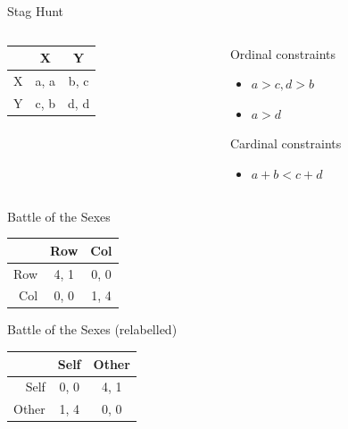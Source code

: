 \documentclass[
  14pt,
  letterpaper,
  ignorenonframetext,
  aspectratio=169,
  handout]{beamer}
\providecommand{\tightlist}{%
  \setlength{\itemsep}{0pt}\setlength{\parskip}{0pt}}\usepackage{longtable,booktabs,array}
\let\olditem\item
\renewcommand{\item}{%
\olditem\vspace{6pt}}
\begin{document}
\begin{frame}[fragile]{Stag Hunt}
\protect\hypertarget{stag-hunt-1}{}
\begin{columns}[T]
\begin{column}{0.4\textwidth}
\begin{table}[!h]
\centering
\begin{tabular}[t]{>{}r|cc}
\toprule
 & X & Y\\
\midrule
X & a, a & b, c\\
Y & c, b & d, d\\
\bottomrule
\end{tabular}
\end{table}
\end{column}

\begin{column}{0.6\textwidth}
Ordinal constraints

\begin{itemize}
\tightlist
\item
  \(a > c, d > b\)
\item
  \(a > d\)
\end{itemize}

Cardinal constraints

\begin{itemize}
\tightlist
\item
  \(a + b < c + d\)
\end{itemize}
\end{column}
\end{columns}
\end{frame}

\begin{frame}[fragile]{Battle of the Sexes}
\protect\hypertarget{battle-of-the-sexes}{}
\begin{table}[!h]
\centering
\begin{tabular}[t]{>{}r|cc}
\toprule
 & Row & Col\\
\midrule
Row & 4, 1 & 0, 0\\
Col & 0, 0 & 1, 4\\
\bottomrule
\end{tabular}
\end{table}
\end{frame}

\begin{frame}[fragile]{Battle of the Sexes (relabelled)}
\protect\hypertarget{battle-of-the-sexes-relabelled}{}
\begin{table}[!h]
\centering
\begin{tabular}[t]{>{}r|cc}
\toprule
 & Self & Other\\
\midrule
Self & 0, 0 & 4, 1\\
Other & 1, 4 & 0, 0\\
\bottomrule
\end{tabular}
\end{table}
\end{frame}
\end{document}
